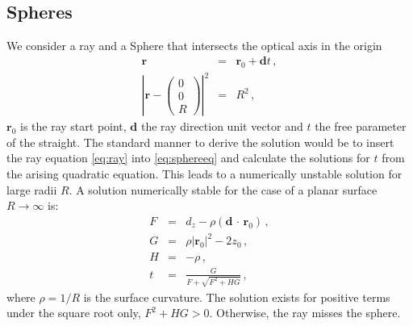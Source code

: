 \documentclass[12pt,a4paper,twoside,openright,BCOR10mm,headsepline,titlepage,abstracton,chapterprefix,final]{scrreprt}
\newcommand\Vector[1]{{\mathbf{#1}}}
\newcommand\Location{\Vector{r}}
\newcommand{\scpm}[2]{(#1\,\cdot\,#2)}
\begin{document}
\subsection{Spheres}
We consider a ray and a Sphere that intersects the optical axis in the origin
\begin{eqnarray}
 \Location &=& \Location_0 + \Vector{d} t \label{eq:ray}\,,\\
 \left| \Location - \begin{pmatrix} 0 \\ 0 \\ R \end{pmatrix} \right|^2 &=& R^2\,, \label{eq:sphereeq}
\end{eqnarray}
$\Location_0$ is the ray start point, $\Vector{d}$ the ray direction unit vector and $t$ the free parameter of the straight.
The standard manner to derive the solution would be to insert the ray equation \eqref{eq:ray} into
\eqref{eq:sphereeq} and calculate the solutions for $t$ from the arising quadratic equation. This leads to a numerically unstable solution
for large radii $R$.
A solution numerically stable for the case of a planar surface $R \rightarrow \infty$ is:
\begin{subequations}
\label{eq:spheresolution}
\begin{eqnarray}
   F &=& d_z - \rho \scpm{\Vector{d}}{\Location_0}\,, \\
   G &=& \rho |\Location_0|^2 - 2 z_0\,, \\
   H &=& - \rho\,, \\
   t &=& \frac{G}{ F + \sqrt{F^2 + H G} }\,, \label{eq:tsolsphere}
\end{eqnarray}
\end{subequations}
where $\rho = 1 / R$ is the surface curvature. 
The solution exists for positive terms under the square root only, $F^2 + H G > 0$. 
Otherwise, the ray misses the sphere.
\end{document}
